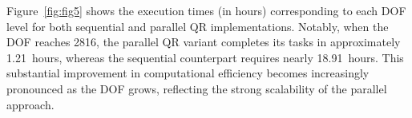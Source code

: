 Figure~\ref{fig:fig5} shows the execution times (in hours) corresponding to each DOF level for both sequential and parallel QR implementations. Notably, when the DOF reaches 2816, the parallel QR variant completes its tasks in approximately 1.21~hours, whereas the sequential counterpart requires nearly 18.91~hours. This substantial improvement in computational efficiency becomes increasingly pronounced as the DOF grows, reflecting the strong scalability of the parallel approach.
